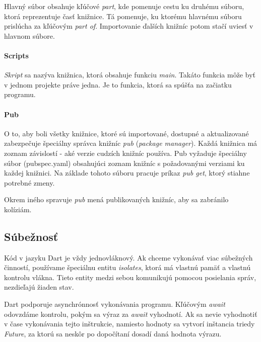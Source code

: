 Hlavný súbor obsahuje kľúčové \emph{part}, kde pomenuje cestu ku druhému súboru, ktorá reprezentuje časť knižnice. Tá pomenuje, ku ktorému hlavnému súboru prislúcha za kľúčovým \emph{part of}.
Importovanie ďalších knižníc potom stačí uviesť v hlavnom súbore.

\paragraph{Scripts}
\emph{Skript} sa nazýva knižnica, ktorá obsahuje funkciu \emph{main}. Takáto funkcia môže byť v jednom projekte práve jedna. Je to funkcia, ktorá sa spúšťa na začiatku programu.

\paragraph{Pub}
O to, aby boli všetky knižnice, ktoré sú importované, dostupné a aktualizované zabezpečuje špeciálny správca knižníc \emph{pub} (\emph{package manager}). 
Každá knižnica má zoznam závislostí - aké verzie cudzích knižníc používa. 
Pub vyžaduje špeciálny súbor (pubspec.yaml) obsahujúci zoznam knižníc s požadovanými verziami ku každej knižnici. Na základe tohoto súboru pracuje príkaz \emph{pub get}, ktorý stiahne potrebné zmeny.

Okrem iného spravuje \emph{pub} mená publikovaných knižníc, aby sa zabránilo kolíziám.

\subsection{Súbežnosť}%
Kód v jazyku Dart je vždy jednovláknový. Ak chceme vykonávať viac súbežných činností, používame špeciálnu entitu \emph{isolates}, ktorá má vlastnú pamäť a vlastnú kontrolu vlákna. Tieto entity medzi sebou komunikujú pomocou posielania správ, nezdieľajú žiaden stav.

Dart podporuje asynchrónnosť vykonávania programu. Kľúčovým \emph{await} odovzdáme kontrolu, pokým sa výraz za \emph{await} vyhodnotí. Ak sa nevie vyhodnotiť v čase vykonávania tejto inštrukcie, namiesto hodnoty sa vytvorí inštancia triedy \emph{Future}, za ktorú sa neskôr po dopočítaní dosadí daná hodnota výrazu.%


